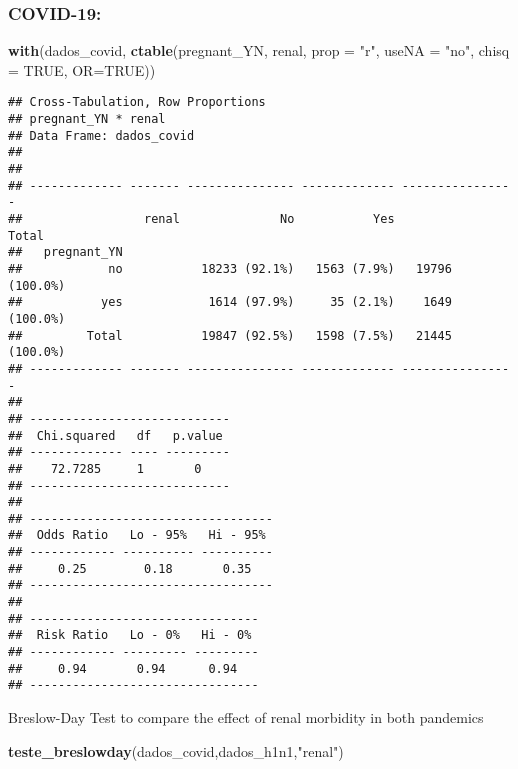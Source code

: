 \documentclass[
]{article}
\newenvironment{Shaded}{\begin{snugshade}}{\end{snugshade}}
\newcommand{\DataTypeTok}[1]{\textcolor[rgb]{0.13,0.29,0.53}{#1}}
\newcommand{\KeywordTok}[1]{\textcolor[rgb]{0.13,0.29,0.53}{\textbf{#1}}}
\newcommand{\NormalTok}[1]{#1}
\newcommand{\OtherTok}[1]{\textcolor[rgb]{0.56,0.35,0.01}{#1}}
\newcommand{\StringTok}[1]{\textcolor[rgb]{0.31,0.60,0.02}{#1}}
\begin{document}
\hypertarget{covid-19-7}{%
\subsubsection{COVID-19:}\label{covid-19-7}}

\begin{Shaded}
\begin{Highlighting}[]
\KeywordTok{with}\NormalTok{(dados_covid, }\KeywordTok{ctable}\NormalTok{(pregnant_YN, renal, }\DataTypeTok{prop =} \StringTok{"r"}\NormalTok{, }\DataTypeTok{useNA =} \StringTok{"no"}\NormalTok{, }\DataTypeTok{chisq =} \OtherTok{TRUE}\NormalTok{, }\DataTypeTok{OR=}\OtherTok{TRUE}\NormalTok{))}
\end{Highlighting}
\end{Shaded}

\begin{verbatim}
## Cross-Tabulation, Row Proportions  
## pregnant_YN * renal  
## Data Frame: dados_covid  
## 
## 
## ------------- ------- --------------- ------------- ----------------
##                 renal              No           Yes            Total
##   pregnant_YN                                                       
##            no           18233 (92.1%)   1563 (7.9%)   19796 (100.0%)
##           yes            1614 (97.9%)     35 (2.1%)    1649 (100.0%)
##         Total           19847 (92.5%)   1598 (7.5%)   21445 (100.0%)
## ------------- ------- --------------- ------------- ----------------
## 
## ----------------------------
##  Chi.squared   df   p.value 
## ------------- ---- ---------
##    72.7285     1       0    
## ----------------------------
## 
## ----------------------------------
##  Odds Ratio   Lo - 95%   Hi - 95% 
## ------------ ---------- ----------
##     0.25        0.18       0.35   
## ----------------------------------
## 
## --------------------------------
##  Risk Ratio   Lo - 0%   Hi - 0% 
## ------------ --------- ---------
##     0.94       0.94      0.94   
## --------------------------------
\end{verbatim}

Breslow-Day Test to compare the effect of renal morbidity in both
pandemics

\begin{Shaded}
\begin{Highlighting}[]
\KeywordTok{teste_breslowday}\NormalTok{(dados_covid,dados_h1n1,}\StringTok{"renal"}\NormalTok{)}
\end{Highlighting}
\end{Shaded}
\end{document}
